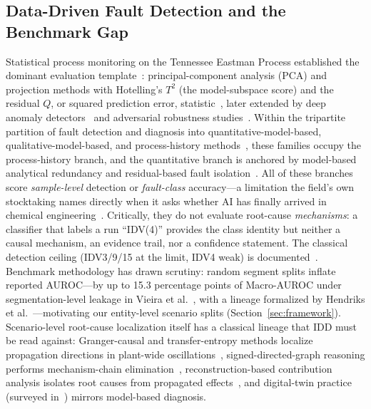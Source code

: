 \documentclass[preprint,10pt]{elsarticle}
\begin{document}
\subsection{Data-Driven Fault Detection and the Benchmark Gap}
Statistical process monitoring on the Tennessee Eastman Process established the dominant evaluation template~\cite{downs1993plant,qin2012survey}: principal-component analysis (PCA) and projection methods with Hotelling's $T^2$ (the model-subspace score) and the residual $Q$, or squared prediction error, statistic~\cite{kano2002comparison,yin2014review}, later extended by deep anomaly detectors~\cite{hartung2023deep,tuli2022tranad} and adversarial robustness studies~\cite{pozdnyakov2024adversarial}. Within the tripartite partition of fault detection and diagnosis into quantitative-model-based, qualitative-model-based, and process-history methods~\cite{venkatasubramanian2003review,venkatasubramanian2003part2,venkatasubramanian2003part3}, these families occupy the process-history branch, and the quantitative branch is anchored by model-based analytical redundancy and residual-based fault isolation~\cite{isermann2005model}. All of these branches score \emph{sample-level} detection or \emph{fault-class} accuracy---a limitation the field's own stocktaking names directly when it asks whether AI has finally arrived in chemical engineering~\cite{venkatasubramanian2019promise}. Critically, they do not evaluate root-cause \emph{mechanisms}: a classifier that labels a run ``IDV(4)'' provides the class identity but neither a causal mechanism, an evidence trail, nor a confidence statement. The classical detection ceiling (IDV3/9/15 at the limit, IDV4 weak) is documented~\cite{russell2000delay,chiang2001fault}. Benchmark methodology has drawn scrutiny: random segment splits inflate reported AUROC---by up to 15.3 percentage points of Macro-AUROC under segmentation-level leakage in Vieira et al.~\cite{vieira2026towards}, with a lineage formalized by Hendriks et al.~\cite{hendriks2022towards}---motivating our entity-level scenario splits (Section~\ref{sec:framework}). Scenario-level root-cause localization itself has a classical lineage that IDD must be read against: Granger-causal and transfer-entropy methods localize propagation directions in plant-wide oscillations~\cite{yuan2014root,bauer2007finding,yoon2001statistical,thornhill2007fault}, signed-directed-graph reasoning performs mechanism-chain elimination~\cite{iri1979algorithm}, reconstruction-based contribution analysis isolates root causes from propagated effects~\cite{dunia1996identification,alcala2009reconstruction}, and digital-twin practice (surveyed in~\cite{tao2019digital}) mirrors model-based diagnosis.
\end{document}
